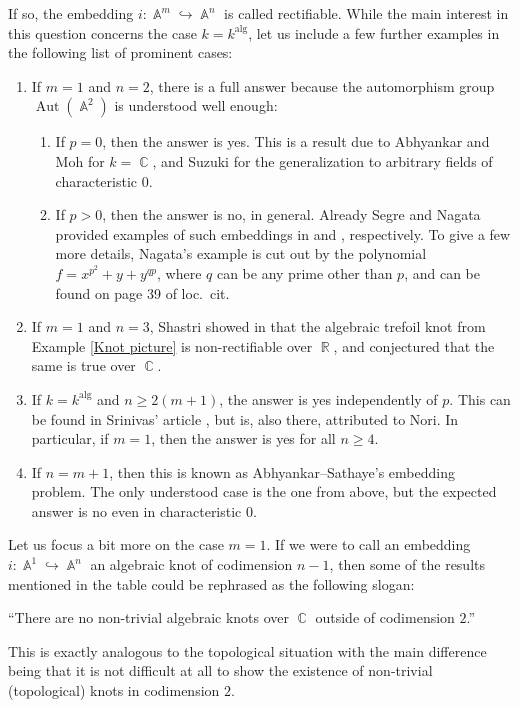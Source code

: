 \documentclass[english]{amsart}
\theoremstyle{definition}
\DeclareMathOperator{\R}{\mathbb{R}}
\DeclareMathOperator{\C}{\mathbb{C}}
\DeclareMathOperator{\A}{\mathbb{A}}
\DeclareMathOperator{\Aut}{Aut}
\DeclareMathOperator{\alg}{alg}
\begin{document}
If so, the embedding $i \colon \A^m \hookrightarrow \A^n$ is called rectifiable. While the main interest in this question concerns the case $k = k^{\alg}$, let us include a few further examples in the following list of prominent cases:
\begin{enumerate}
\item[$\bullet$] If $m = 1$ and $n = 2$, there is a full answer because the automorphism group $\Aut(\A^2)$ is understood well enough:
\begin{enumerate}
\item[$\bullet$] If $p = 0$, then the answer is yes. This is a result due to Abhyankar and Moh \cite{MR379502} for $k = \C$, and Suzuki \cite{MR338423} for the generalization to arbitrary fields of characteristic $0$.
\item[$\bullet$] If $p > 0$, then the answer is no, in general. Already Segre and Nagata provided examples of such embeddings in \cite{MR95175} and \cite{MR337962}, respectively. To give a few more details, Nagata's example is cut out by the polynomial $f = x^{p^2} + y + y^{qp}$, where $q$ can be any prime other than $p$, and can be found on page 39 of loc.\ cit.
\end{enumerate}
\item[$\bullet$] If $m = 1$ and $n = 3$, Shastri showed in \cite{MR1145717} that the algebraic trefoil knot from Example \ref{Knot picture} is non-rectifiable over $\R$, and conjectured that the same is true over $\C$. 
\item[$\bullet$] If $k = k^{\alg}$ and $n \geq 2(m+1)$, the answer is yes independently of $p$. This can be found in Srinivas' article \cite{MR1087241}, but is, also there, attributed to Nori. In particular, if $m = 1$, then the answer is yes for all $n \geq 4$.

\item[$\bullet$] If $n = m+1$, then this is known as Abhyankar--Sathaye's embedding problem. The only understood case is the one from above, but the expected answer is no even in characteristic $0$.
\end{enumerate}

Let us focus a bit more on the case $m = 1$. If we were to call an embedding $i \colon \A^1 \hookrightarrow \A^n$ an algebraic knot of codimension $n - 1$, then some of the results mentioned in the table could be rephrased as the following slogan:
\begin{center}
 ``There are no non-trivial algebraic knots over $\C$ outside of codimension $2$.''
\end{center}
This is exactly analogous to the topological situation with the main difference being that it is not difficult at all to show the existence of non-trivial (topological) knots in codimension $2$. 
\end{document}
